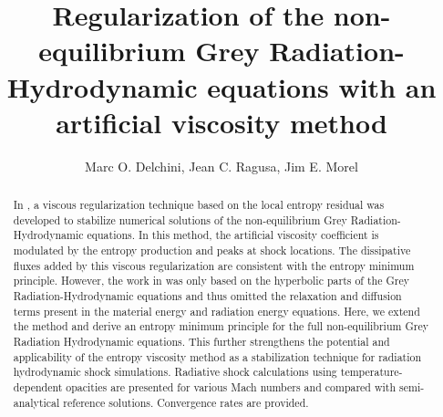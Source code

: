 \documentclass[times]{fldauth}
\begin{document}
%


\title{Regularization of the non-equilibrium Grey Radiation-Hydrodynamic equations with an artificial viscosity method}

\author{Marc O. Delchini, Jean C. Ragusa\corrauth{}, Jim E. Morel}

\address{Department of Nuclear Engineering, Texas A\&M University, College Station, TX 77843, USA}


\begin{abstract}
In \cite{our_jcp_radhy_paper}, 
a viscous regularization technique based on the local entropy residual was
developed to stabilize numerical solutions of the non-equilibrium Grey 
Radiation-Hydrodynamic equations. 
In this method, the artificial viscosity coefficient is modulated by the entropy production and peaks at shock locations. 
The dissipative fluxes added by this viscous regularization are consistent with the entropy minimum principle. 
However, the work in \cite{our_jcp_radhy_paper} was only based on the hyperbolic parts
of the Grey Radiation-Hydrodynamic equations and thus omitted the relaxation and diffusion terms 
present in the material energy and radiation energy equations. 
%
Here, we extend the method and derive an entropy minimum principle for the full non-equilibrium Grey Radiation Hydrodynamic 
equations. This further strengthens the potential and applicability of the entropy viscosity method as a stabilization technique 
for radiation hydrodynamic shock simulations. 
 
Radiative shock calculations using temperature-dependent opacities are presented for various Mach numbers and 
compared with semi-analytical reference solutions. Convergence rates are provided.
\end{abstract}
\end{document}
